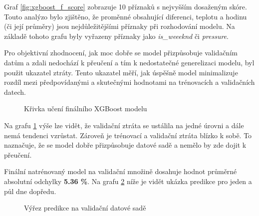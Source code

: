\documentclass[FM,BP,fonts]{tulthesis}
\begin{document}
Graf \ref{fig:xgboost_f_score} zobrazuje 10 příznaků s nejvyšším dosaženým skóre. Touto analýzo bylo zjištěno, že proměnné obsahující diferenci, teplotu a hodinu (či její průměry) jsou nejdůležitějšími příznaky při rozhodování modelu. Na základě tohoto grafu byly vyřazeny příznaky jako \textit{is\_weeeknd} či \textit{pressure}.

Pro objektivní zhodnocení, jak moc dobře se model přizpůsobuje validačním datům a zdali nedochází k přeučení a tím k nedostatečné generelizaci modelu, byl použit ukazatel ztráty. Tento ukazatel měří, jak úspěšně model minimalizuje rozdíl mezi předpovídanými a skutečnými hodnotami na trénovacích a validačních datech.


\begin{figure}[htbp]
	\centering
	\caption{Křivka učení finálního XGBoost modelu}
	\label{fig:xgboost_learning_curve}
\end{figure}

Na grafu \ref{fig:xgboost_learning_curve} výše lze vidět, že validační ztráta se ustálila na jedné úrovni a dále nemá tendenci vzrůstat. Zároveň je trénovací a  validační ztráta blízko k sobě. To naznačuje, že se model dobře přizpůsobuje datové sadě a nemělo by zde dojit k přeučení.

Finální natrénovaný model na validační množině dosahuje hodnot průměrné absolutní odchylky \textbf{5.36 \%}. Na grafu \ref{fig:xgboost_predictions} níže je vidět ukázka predikce pro jeden a půl dne dopředu.

\begin{figure}[htbp]
	\centering
	\caption{Výřez predikce na validační datové sadě}
	\label{fig:xgboost_predictions}
\end{figure}
\end{document}
